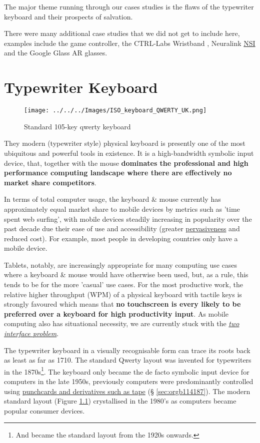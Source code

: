 \documentclass[logo,bsc,singlespacing,parskip]{infthesis}
\begin{document}
The major theme running through our cases studies is the flaws of the typewriter keyboard and their prospects of salvation.

There were many additional case studies that we did not get to include here, examples include the game controller, the CTRL-Labs Wristband \autocite{27CTRLlabsLinkedIn}, Neuralink \hyperref[org5662848]{NSI} \autocite{muskNeuralink} and the Google Glass AR glasses.
\chapter{Typewriter Keyboard}
\label{sec:orgd7e18d8}
\begin{figure}[h]
\centering
\texttt{[image: ../../../Images/ISO\_keyboard\_QWERTY\_UK.png]}
\caption{\label{fig:stand_keyb}Standard 105-key qwerty keyboard}
\end{figure}

They modern (typewriter style) physical keyboard is presently one of the most ubiquitous and powerful tools in existence.
It is a high-bandwidth symbolic input device, that, together with the mouse \textbf{dominates the professional and high performance computing landscape where there are effectively no market share competitors}.

In terms of total computer usage, the keyboard \& mouse currently has approximately equal market share to mobile devices by metrics such as 'time spent web surfing', with mobile devices steadily increasing in popularity over the past decade due their ease of use and accessibility (greater \hyperref[pervasiveness]{pervasiveness} and reduced cost).
For example, most people in developing countries only have a mobile device.

Tablets, notably, are increasingly appropriate for many computing use cases where a keyboard \& mouse would have otherwise been used, but, as a rule, this tends to be for the more 'casual' use cases.
For the most productive work, the relative higher throughput (WPM) of a physical keyboard with tactile keys is strongly favoured which means that \textbf{no touchscreen is every likely to be preferred over a keyboard for high productivity input}.
As mobile computing also has situational necessity, we are currently stuck with the \emph{\hyperref[two interface problem]{two interface problem}}.

The typewriter keyboard in a visually recognisable form can trace its roots back as least as far as 1710.
The standard Qwerty layout was invented for typewriters in the 1870s\footnote{And became the standard layout from the 1920s onwards.}.
The keyboard only became the de facto symbolic input device for computers in the late 1950s, previously computers were predominantly controlled using \hyperref[sec:orgb114187]{punchcards and derivatives such as tape} (§ \ref{sec:orgb114187}).
The modern standard layout (Figure \ref{fig:stand_keyb}) crystallised in the 1980's as computers became popular consumer devices.
\end{document}
